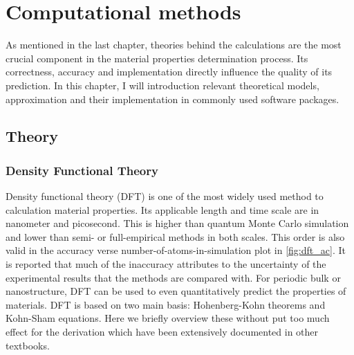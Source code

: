 
\chapter{Computational methods \label{chap:2}}

\ifpdf
    \graphicspath{{Chapter2/Figs/Raster/}{Chapter2/Figs/PDF/}{Chapter2/Figs/}}
\else
    \graphicspath{{Chapter2/Figs/Vector/}{Chapter2/Figs/}}
\fi

As mentioned in the last chapter, theories behind the calculations are the most crucial component in the material properties determination process. Its correctness, accuracy and implementation directly influence the quality of its prediction. In this chapter, I will introduction relevant theoretical models, approximation and their implementation in commonly used software packages.

\section{Theory}
\subsection{Density Functional Theory}

Density functional theory (DFT) is one of the most widely used method to calculation material properties. Its applicable length and time scale are in nanometer and picosecond. This is higher than quantum Monte Carlo simulation and lower than semi- or full-empirical methods in both scales. This order is also valid in the accuracy verse number-of-atoms-in-simulation plot in \autoref{fig:dft_ac}. It is reported that much of the inaccuracy attributes to the uncertainty of the experimental results that the methods are compared with\cite{Kirklin2015}. For periodic bulk or nanostructure, DFT can be used to even quantitatively predict the properties of materials. DFT
is based on two main basis: Hohenberg-Kohn theorems\cite{Hohenberg1964} and Kohn-Sham equations\cite{Kohn1965}. Here we briefly overview these without put too much effect for the derivation which have been extensively documented in other textbooks. 

